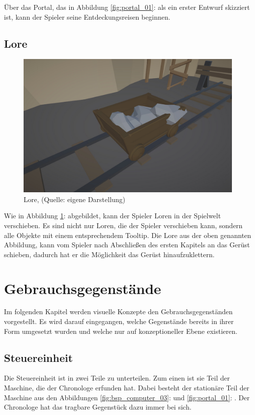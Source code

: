 Über das Portal, das in Abbildung \ref{fig:portal_01}:  als ein erster Entwurf skizziert ist, kann der Spieler seine Entdeckungsreisen beginnen.

\subsection{Lore}

\begin{figure}[ht]
\centering
\includegraphics[width=0.6\linewidth]{content/pictures/Lore.jpg}
\caption{Lore, (Quelle: eigene Darstellung)}
\label{fig:lore}
\end{figure}

Wie in Abbildung \ref{fig:lore}:  abgebildet, kann der Spieler Loren in der Spielwelt verschieben. Es sind nicht nur Loren, die der Spieler verschieben kann, sondern alle Objekte mit einem entsprechendem Tooltip. Die Lore aus der oben genannten Abbildung, kann vom Spieler nach Abschließen des ersten Kapitels an das Gerüst schieben, dadurch hat er die Möglichkeit das Gerüst hinaufzuklettern.

\section{Gebrauchsgegenstände}
Im folgenden Kapitel werden visuelle Konzepte den Gebrauchsgegenständen vorgestellt. Es wird darauf eingegangen, welche Gegenstände bereits in ihrer Form umgesetzt wurden und welche nur auf konzeptioneller Ebene existieren.

\subsection{Steuereinheit}
Die Steuereinheit ist in zwei Teile zu unterteilen. Zum einen ist sie Teil der Maschine, die der Chronologe erfunden hat. Dabei besteht der stationäre Teil der Maschine aus den Abbildungen \ref{fig:bsp_computer_03}:  und \ref{fig:portal_01}: . Der Chronologe hat das tragbare Gegenstück dazu immer bei sich.

